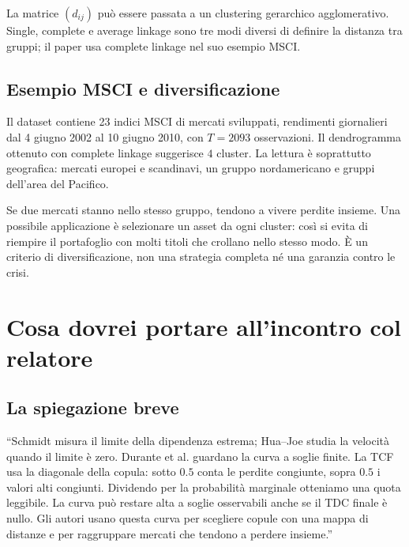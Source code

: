 \documentclass[11pt,a4paper]{article}
\begin{document}
La matrice $(d_{ij})$ può essere passata a un clustering gerarchico
agglomerativo. Single, complete e average linkage sono tre modi diversi di
definire la distanza tra gruppi; il paper usa complete linkage nel suo esempio
MSCI.

\subsection{Esempio MSCI e diversificazione}
Il dataset contiene 23 indici MSCI di mercati sviluppati, rendimenti giornalieri
dal 4 giugno 2002 al 10 giugno 2010, con $T=2093$ osservazioni. Il dendrogramma
ottenuto con complete linkage suggerisce $4$ cluster. La lettura è soprattutto
geografica: mercati europei e scandinavi, un gruppo nordamericano e gruppi
dell'area del Pacifico.

Se due mercati stanno nello stesso gruppo, tendono a vivere perdite insieme.
Una possibile applicazione è selezionare un asset da ogni cluster: così si
evita di riempire il portafoglio con molti titoli che crollano nello stesso
modo. È un criterio di diversificazione, non una strategia completa né una
garanzia contro le crisi.

\section{Cosa dovrei portare all'incontro col relatore}

\subsection*{La spiegazione breve}
``Schmidt misura il limite della dipendenza estrema; Hua--Joe studia la velocità
quando il limite è zero. Durante et al. guardano la curva a soglie finite. La
TCF usa la diagonale della copula: sotto $0.5$ conta le perdite congiunte,
sopra $0.5$ i valori alti congiunti. Dividendo per la probabilità marginale
otteniamo una quota leggibile. La curva può restare alta a soglie osservabili
anche se il TDC finale è nullo. Gli autori usano questa curva per scegliere
copule con una mappa di distanze e per raggruppare mercati che tendono a perdere
insieme.''
\end{document}
